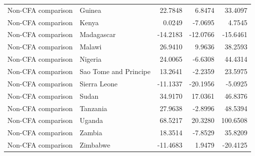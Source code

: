 \begin{table}
\begin{tabular}[t]{llrrr}
Non-CFA comparison & Guinea & 22.7848 & 6.8474 & 33.4097\\
Non-CFA comparison & Kenya & 0.0249 & -7.0695 & 4.7545\\
\addlinespace
Non-CFA comparison & Madagascar & -14.2183 & -12.0766 & -15.6461\\
Non-CFA comparison & Malawi & 26.9410 & 9.9636 & 38.2593\\
Non-CFA comparison & Nigeria & 24.0065 & -6.6308 & 44.4314\\
Non-CFA comparison & Sao Tome and Principe & 13.2641 & -2.2359 & 23.5975\\
Non-CFA comparison & Sierra Leone & -11.1337 & -20.1956 & -5.0925\\
\addlinespace
Non-CFA comparison & Sudan & 34.9170 & 17.0361 & 46.8376\\
Non-CFA comparison & Tanzania & 27.9638 & -2.8996 & 48.5394\\
Non-CFA comparison & Uganda & 68.5217 & 20.3280 & 100.6508\\
Non-CFA comparison & Zambia & 18.3514 & -7.8529 & 35.8209\\
Non-CFA comparison & Zimbabwe & -11.4683 & 1.9479 & -20.4125\\
\bottomrule
\end{tabular}
\end{table}